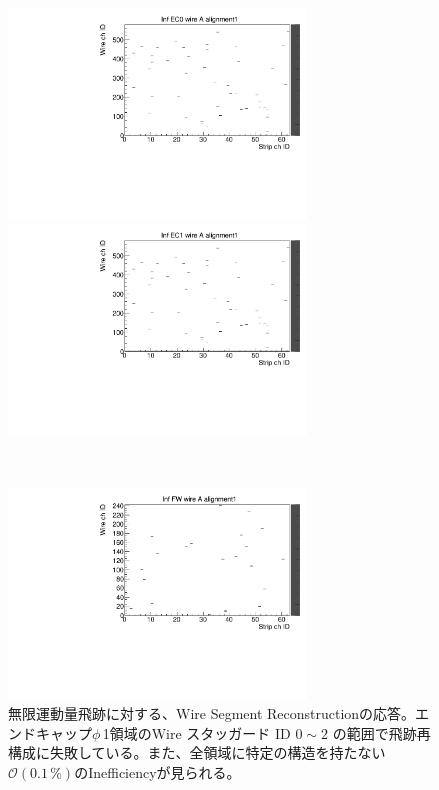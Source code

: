 \begin{figure}
    \begin{minipage}[b]{.5\linewidth}
        \centering
        \includegraphics[height=5.6cm]{fig/Test/A_InfEC0_wire.pdf}
    \end{minipage}
    \begin{minipage}[b]{.5\linewidth}
        \centering
        \includegraphics[height=5.6cm]{fig/Test/A_InfEC1_wire.pdf}
    \end{minipage}\\
    \begin{minipage}[b]{\linewidth}
        \centering
        \includegraphics[height=5.6cm]{fig/Test/A_InfFW_wire.pdf}
    \end{minipage}
    \caption[異なる画像形式の比較]{無限運動量飛跡に対する、Wire Segment Reconstructionの応答。エンドキャップ$\phi\,$1領域のWire スタッガード ID $0 \sim 2$ の範囲で飛跡再構成に失敗している。また、全領域に特定の構造を持たない$\mathcal{O}(0.1\,\%)$のInefficiencyが見られる。}
    \label{Inf_A_Wire}
\end{figure}


